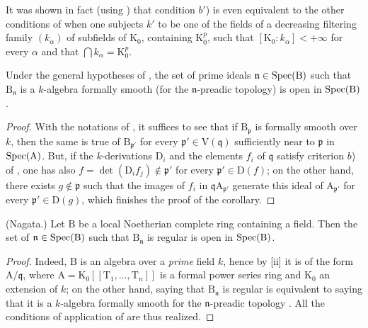 \begin{remark}[22.7.4]
\label{0.22.7.4}
It was shown in fact (using ) that condition $b'$) is even equivalent to the other conditions of  when one subjects $k'$ to be one of the fields of a decreasing filtering family $(k_\alpha)$ of subfields of $\mathrm{K}_0$, containing $\mathrm{K}_0^p$, such that $[\mathrm{K}_0:k_\alpha]<+\infty$ for every $\alpha$ and that $\bigcap k_\alpha=\mathrm{K}_0^p$.
\end{remark}

\begin{corollary}[22.7.5]
\label{0.22.7.5}
Under the general hypotheses of , the set of prime ideals $\mathfrak{n}\in\operatorname{Spec}(\mathrm{B})$ such that $\mathrm{B}_\mathfrak{n}$ is a $k$-algebra formally smooth (for the $\mathfrak{n}$-preadic topology) is open in $\operatorname{Spec}(\mathrm{B})$.
\end{corollary}

\begin{proof}
With the notations of , it suffices to see that if $\mathrm{B}_\mathfrak{p}$ is formally smooth over $k$, then the same is true of $\mathrm{B}_{\mathfrak{p}'}$ for every $\mathfrak{p}'\in\mathrm{V}(\mathfrak{q})$ sufficiently near to $\mathfrak{p}$ in $\operatorname{Spec}(\mathrm{A})$.
But, if the $k$-derivations $\mathrm{D}_i$ and the elements $f_i$ of $\mathfrak{q}$ satisfy criterion $b$) of , one has also $f=\det(\mathrm{D}_if_j)\notin\mathfrak{p}'$ for every $\mathfrak{p}'\in\mathrm{D}(f)$; on the other hand, there exists $g\notin\mathfrak{p}$ such that the images of $f_i$ in $\mathfrak{q}\mathrm{A}_{\mathfrak{p}'}$ generate this ideal of $\mathrm{A}_{\mathfrak{p}'}$ for every $\mathfrak{p}'\in\mathrm{D}(g)$, which finishes the proof of the corollary.
\end{proof}

\begin{corollary}[22.7.6]
\label{0.22.7.6}
\textnormal{(Nagata.)}
Let $\mathrm{B}$ be a local Noetherian complete ring containing a field.
Then the set of $\mathfrak{n}\in\operatorname{Spec}(\mathrm{B})$ such that $\mathrm{B}_\mathfrak{n}$ is regular is open in $\operatorname{Spec}(\mathrm{B})$.
\end{corollary}

\begin{proof}
Indeed, $\mathrm{B}$ is an algebra over a \emph{prime} field $k$, hence by [ii] it is of the form $\mathrm{A}/\mathfrak{q}$, where $\mathrm{A}=\mathrm{K}_0[[\mathrm{T}_1,\ldots,\mathrm{T}_n]]$ is a formal power series ring and $\mathrm{K}_0$ an extension of $k$; on the other hand, saying that $\mathrm{B}_\mathfrak{n}$ is regular is equivalent to saying that it is a $k$-algebra formally smooth for the $\mathfrak{n}$-preadic topology .
All the conditions of application of  are thus realized.
\end{proof}

